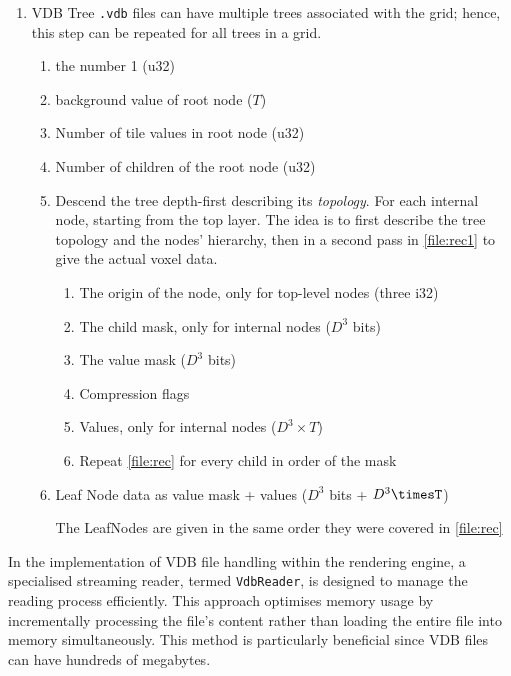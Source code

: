 \begin{enumerate}
\begin{enumerate}
        \end{enumerate}
  \item VDB Tree
        \verb|.vdb| files can have multiple trees associated with the grid; hence, this step can be repeated for all trees in a grid.
        \begin{enumerate}
          \item the number 1 (u32)
          \item background value of root node ($T$)
          \item Number of tile values in root node (u32)
          \item Number of children of the root node (u32)
          \item Descend the tree depth-first describing its \emph{topology}.
                For each internal node, starting from the top layer.
                The idea is to first describe the tree topology and the nodes' hierarchy, then in a second pass in \cref{file:rec1} to give the actual voxel data.
                \begin{enumerate}
                \label{file:rec}
                  \item The origin of the node, only for top-level nodes (three i32)
                  \item The child mask, only for internal nodes ($D^3$ bits)
                  \item The value mask ($D^3$ bits)
                  \item Compression flags
                  \item Values, only for internal nodes ($D^{3} \times T$)
                  \item Repeat \cref{file:rec} for every child in order of the mask
                \end{enumerate}
          \item\label{file:rec1} Leaf Node data as value mask + values ($D^{3}$ bits + $D^{3}\timesT$)

                The LeafNodes are given in the same order they were covered in \cref{file:rec}
        \end{enumerate}
\end{enumerate}

In the implementation of VDB file handling within the rendering engine, a specialised streaming reader, termed \texttt{VdbReader}, is designed to manage the reading process efficiently.
This approach optimises memory usage by incrementally processing the file's content rather than loading the entire file into memory simultaneously.
This method is particularly beneficial since VDB files can have hundreds of megabytes.

